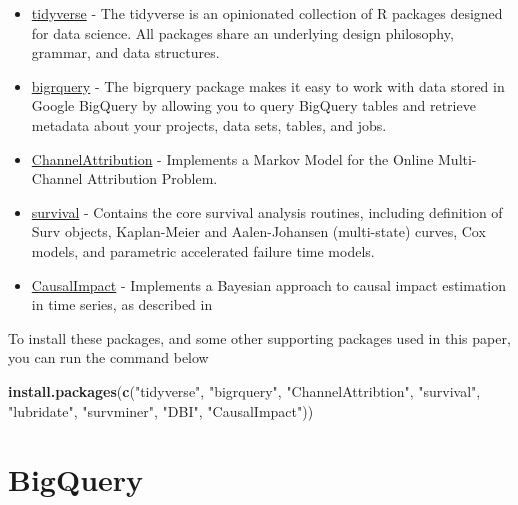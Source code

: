 \documentclass[]{book}
\newenvironment{Shaded}{\begin{snugshade}}{\end{snugshade}}
\newcommand{\KeywordTok}[1]{\textcolor[rgb]{0.13,0.29,0.53}{\textbf{#1}}}
\newcommand{\StringTok}[1]{\textcolor[rgb]{0.31,0.60,0.02}{#1}}
\newcommand{\NormalTok}[1]{#1}
\begin{document}
\begin{itemize}
\item
  \href{https://www.tidyverse.org/}{tidyverse} - The tidyverse is an
  opinionated collection of R packages designed for data science. All
  packages share an underlying design philosophy, grammar, and data
  structures. \citep{R-tidyverse}
\item
  \href{https://bigrquery.r-dbi.org/}{bigrquery} - The bigrquery package
  makes it easy to work with data stored in Google BigQuery by allowing
  you to query BigQuery tables and retrieve metadata about your
  projects, data sets, tables, and jobs. \citep{R-bigrquery}
\item
  \href{https://cran.r-project.org/web/packages/ChannelAttribution}{ChannelAttribution}
  - Implements a Markov Model for the Online Multi-Channel Attribution
  Problem. \citep{R-ChannelAttribution}
\item
  \href{https://cran.r-project.org/web/packages/survival/}{survival} -
  Contains the core survival analysis routines, including definition of
  Surv objects, Kaplan-Meier and Aalen-Johansen (multi-state) curves,
  Cox models, and parametric accelerated failure time models.
  \citep{R-survival}
\item
  \href{https://cran.r-project.org/web/packages/CausalImpact/}{CausalImpact}
  - Implements a Bayesian approach to causal impact estimation in time
  series, as described in \citet{causalimpact}
\end{itemize}

To install these packages, and some other supporting packages used in
this paper, you can run the command below

\begin{Shaded}
\begin{Highlighting}[]
\KeywordTok{install.packages}\NormalTok{(}\KeywordTok{c}\NormalTok{(}\StringTok{"tidyverse"}\NormalTok{, }\StringTok{"bigrquery"}\NormalTok{, }\StringTok{"ChannelAttribtion"}\NormalTok{, }\StringTok{"survival"}\NormalTok{,}
                   \StringTok{"lubridate"}\NormalTok{, }\StringTok{"survminer"}\NormalTok{, }\StringTok{"DBI"}\NormalTok{, }\StringTok{"CausalImpact"}\NormalTok{))}
\end{Highlighting}
\end{Shaded}

\section{BigQuery}\label{bigquery-1}
\end{document}
